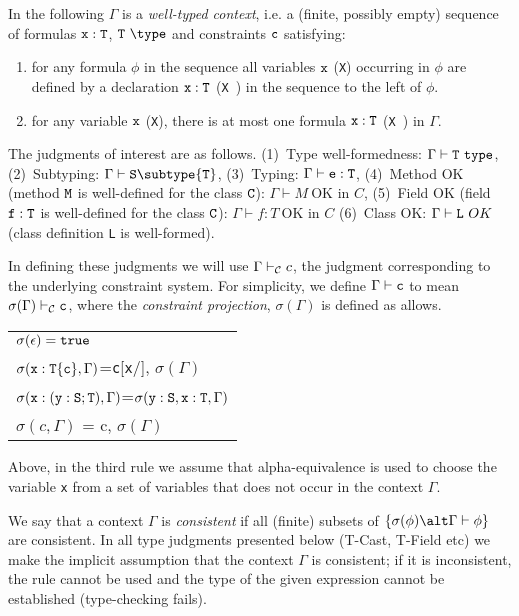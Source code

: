 In the following $\Gamma$ is a {\em well-typed context}, i.e.{} a
(finite, possibly empty) sequence of formulas $\tt x:T$, $\tt T\
\type$ and constraints $\tt c$ satisfying:
\begin{enumerate}
  \item for any formula $\phi$ in the sequence all variables $\tt x$
    ({\tt X}) occurring in $\phi$ are defined by a declaration $\tt
    x:T$ ({\tt X\ \type}) in the sequence to the left of $\phi$.

  \item for any variable $\tt x$ ({\tt X}), there is at most one
  formula $\tt x:T$ ({\tt X\ \type})  in $\Gamma$.
\end{enumerate}

The judgments of interest are as follows. 
(1)~Type well-formedness:  $\Gamma \vdash {\tt T} \ {\tt type}$,
(2)~Subtyping: $\Gamma \vdash {\tt S} \subtype {\tt T}$,
(3)~Typing:   $\Gamma   \vdash {\tt e:T}$,
(4)~Method OK (method $\tt M$ is well-defined for the class $\tt C$): $\Gamma \vdash M\ \mbox{OK in $C$}$,
(5)~Field OK (field $\tt f:T$ is well-defined for the class $\tt
   C$): $\Gamma \vdash f:T\ \mbox{OK in $C$}$
(6)~Class OK: $\Gamma \vdash {\tt L} \ OK$ (class definition {\tt L} is well-formed). 

In defining these judgments we will use $\Gamma \vdash_{\cal C} c$,
the judgment corresponding to the underlying constraint system. For
simplicity, we define $\Gamma \vdash {\tt c}$ to mean
$\sigma(\Gamma)\vdash_{\cal C} {\tt c}$, where the {\em constraint
projection}, $\sigma(\Gamma)$ is defined as allows. 

\begin{tabular}{l}
$\sigma(\epsilon)={\tt true}$\\
$\sigma({\tt x}:{\tt T\{c\}}, \Gamma)$={\tt c}[{\tt x}/\self], $\sigma(\Gamma)$\\
$\sigma({\tt x}:{\tt (y:S;T)}, \Gamma)$=$\sigma({\tt y:S}, {\tt x}:{\tt T},\Gamma)$\\
$\sigma(c,\Gamma)$ = c, $\sigma(\Gamma)$
\end{tabular}

\noindent Above, in the third rule we assume that alpha-equivalence is used to
choose the variable {\tt x} from a set of variables that does not
occur in the context $\Gamma$.

We say that a context $\Gamma$ is {\em consistent} if all (finite)
subsets of $\{\sigma(\phi)\alt \Gamma \vdash \phi\}$ are consistent.
In all type judgments presented below ({\sc T-Cast}, {\sc T-Field}
etc) we make the implicit assumption that the context $\Gamma$ is
consistent; if it is inconsistent, the rule cannot be used and the
type of the given expression cannot be established (type-checking
fails).

